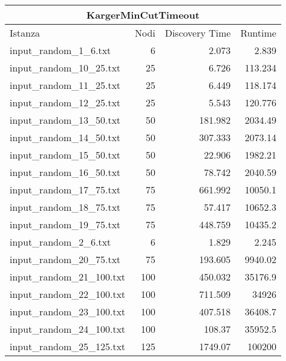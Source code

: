 \begin{table}[H]
    \centering

    \begin{tabular}{lrrr}
     \hline
     \multicolumn{4}{c}{KargerMinCutTimeout} \\
     \hline
     Istanza                    &   Nodi &   Discovery Time  &        Runtime \\
     \hline
     input\_random\_1\_6.txt    &       6 &            2.073 &          2.839 \\
     input\_random\_10\_25.txt  &      25 &            6.726 &        113.234 \\
     input\_random\_11\_25.txt  &      25 &            6.449 &        118.174 \\
     input\_random\_12\_25.txt  &      25 &            5.543 &        120.776 \\
     input\_random\_13\_50.txt  &      50 &          181.982 &       2034.49  \\
     input\_random\_14\_50.txt  &      50 &          307.333 &       2073.14  \\
     input\_random\_15\_50.txt  &      50 &           22.906 &       1982.21  \\
     input\_random\_16\_50.txt  &      50 &           78.742 &       2040.59  \\
     input\_random\_17\_75.txt  &      75 &          661.992 &      10050.1   \\
     input\_random\_18\_75.txt  &      75 &           57.417 &      10652.3   \\
     input\_random\_19\_75.txt  &      75 &          448.759 &      10435.2   \\
     input\_random\_2\_6.txt    &       6 &            1.829 &          2.245 \\
     input\_random\_20\_75.txt  &      75 &          193.605 &       9940.02  \\
     input\_random\_21\_100.txt &     100 &          450.032 &      35176.9   \\
     input\_random\_22\_100.txt &     100 &          711.509 &      34926     \\
     input\_random\_23\_100.txt &     100 &          407.518 &      36408.7   \\
     input\_random\_24\_100.txt &     100 &          108.37  &      35952.5   \\
     input\_random\_25\_125.txt &     125 &         1749.07  &     100200     \\

\end{tabular}
\end{table}
